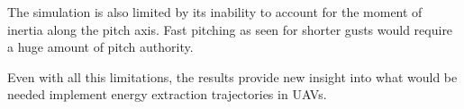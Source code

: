 \par The simulation is also limited by its inability to account for the moment of inertia along the pitch axis.
Fast pitching as seen for shorter gusts would require a huge amount of pitch authority.

\par Even with all this limitations, the results provide new insight into what would be needed implement energy extraction trajectories in UAVs.


